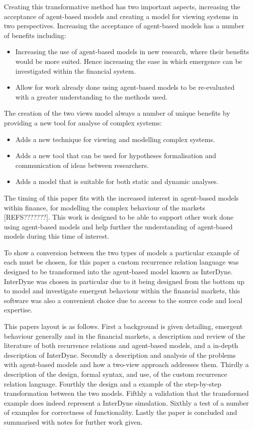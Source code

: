 \documentclass{article}
\begin{document}
Creating this transformative method has  two important aspects, increasing the acceptance of agent-based models and creating a model for viewing systems in two perspectives. Increasing the acceptance of agent-based models has a number of benefits including: 
\begin{itemize}
   \item Increasing the use of agent-based models in new research, where their benefits would be more suited. Hence increasing the ease in which emergence can be investigated within the financial system. 
   \item Allow for work already done using agent-based models to be re-evaluated with a greater understanding to the methods used. 
\end{itemize}
The creation of the two views model always a number of unique benefits by providing a new tool for analyse of complex systems: 
 \begin{itemize}
    \item Adds a new technique for viewing and modelling complex systems.
    \item Adds a new tool that can be used for hypotheses formalisation and communication of ideas between researchers. 
    \item Adds a model that is suitable for both static and dynamic analyses. 
 \end{itemize}
The timing of this paper fits with the increased interest in agent-based models within finance, for modelling the complex behaviour of the markets [REFS???????]. %
This work is designed to be able to support other work done using agent-based models and help further the understanding of agent-based models during this time of interest.

To show a conversion between the two types of models a particular example of each must be chosen, for this paper a custom recurrence relation language was designed to be transformed into the agent-based model known as InterDyne. InterDyne was chosen in particular due to it being designed from the bottom up to model and investigate emergent behaviour within the financial markets, this software was also a convenient choice due to access to the source code and local expertise.   

This papers layout is as follows. First a background is given detailing, emergent behaviour generally and in the financial markets, a description and review of the literature of both recurrence relations and agent-based models, and a in-depth description of InterDyne. Secondly a description and analysis of the problems with agent-based models and how a two-view approach addresses them. Thirdly a description of the design, formal syntax, and use, of the custom recurrence relation language. Fourthly the design and a example of the step-by-step transformation between the two models. Fifthly a validation that the transformed example does indeed represent a InterDyne simulation. Sixthly a test of a number of examples for correctness of functionality. Lastly the paper is concluded and summarised with notes for further work given.     
\end{document}
